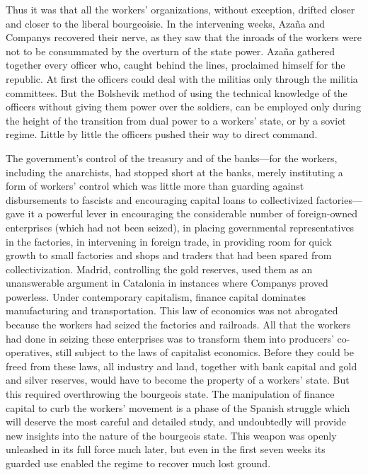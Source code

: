 Thus it was that all the workers’ organizations, without exception, drifted closer and closer to the liberal bourgeoisie. In the intervening weeks, Azaña and Companys recovered their nerve, as they saw that the inroads of the workers were not to be consummated by the overturn of the state power. Azaña gathered together every officer who, caught behind the lines, proclaimed himself for the republic. At first the officers could deal with the militias only through the militia committees. But the Bolshevik method of using the technical knowledge of the officers without giving them power over the soldiers, can be employed only during the height of the transition from dual power to a workers’ state, or by a soviet regime. Little by little the officers pushed their way to direct command.

The government’s control of the treasury and of the banks---for the workers, including the anarchists, had stopped short at the banks, merely instituting a form of workers’ control which was little more than guarding against disbursements to fascists and encouraging capital loans to collectivized factories---gave it a powerful lever in encouraging the considerable number of foreign-owned enterprises (which had not been seized), in placing governmental representatives in the factories, in intervening in foreign trade, in providing room for quick growth to small factories and shops and traders that had been spared from collectivization. Madrid, controlling the gold reserves, used them as an unanswerable argument in Catalonia in instances where Companys proved powerless. Under contemporary capitalism, finance capital dominates manufacturing and transportation. This law of economics was not abrogated because the workers had seized the factories and railroads. All that the workers had done in seizing these enterprises was to transform them into producers’ co-operatives, still subject to the laws of capitalist economics. Before they could be freed from these laws, all industry and land, together with bank capital and gold and silver reserves, would have to become the property of a workers’ state. But this required overthrowing the bourgeois state. The manipulation of finance capital to curb the workers’ movement is a phase of the Spanish struggle which will deserve the most careful and detailed study, and undoubtedly will provide new insights into the nature of the bourgeois state. This weapon was openly unleashed in its full force much later, but even in the first seven weeks its guarded use enabled the regime to recover much lost ground.

